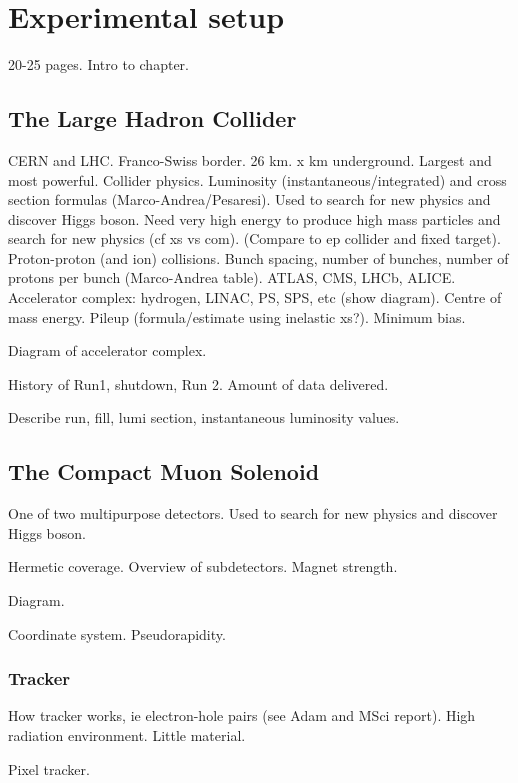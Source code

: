 \chapter{Experimental setup}
\label{chap:detector}

20-25 pages.
Intro to chapter.

\section{The Large Hadron Collider}

CERN and LHC. Franco-Swiss border. 26 km. x km underground. Largest and most 
powerful.
Collider physics. Luminosity (instantaneous/integrated) and cross 
section formulas (Marco-Andrea/Pesaresi).
Used to search for new physics and discover Higgs boson.
Need very high energy to produce high mass particles and search for new physics 
(cf xs vs com).
(Compare to ep collider and fixed target).
Proton-proton (and ion) collisions.
Bunch spacing, number of bunches, number of protons per bunch (Marco-Andrea 
table).
ATLAS, CMS, LHCb, ALICE.
Accelerator complex: hydrogen, LINAC, PS, SPS, etc (show diagram).
Centre of mass energy. 
Pileup (formula/estimate using inelastic xs?). Minimum bias.

Diagram of accelerator complex.

History of Run1, shutdown, Run 2. Amount of data delivered.

Describe run, fill, lumi section, instantaneous luminosity values.

\section{The Compact Muon Solenoid}

One of two multipurpose detectors. Used to search for new physics and discover 
Higgs boson.

Hermetic coverage. Overview of subdetectors. Magnet strength.

Diagram.

Coordinate system. Pseudorapidity.

\subsection{Tracker}

How tracker works, ie electron-hole pairs (see Adam and MSci report).
High radiation environment. Little material.

Pixel tracker.

